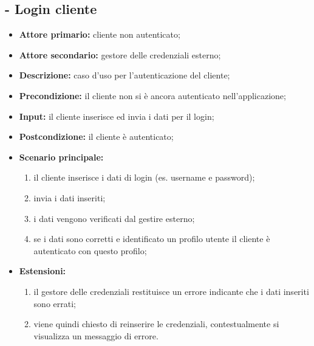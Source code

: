 \subsection{ - Login cliente}
\begin{itemize}
    \item \textbf{Attore primario:} cliente non autenticato;
    \item \textbf{Attore secondario:} gestore delle credenziali esterno;
    \item \textbf{Descrizione:} caso d'uso per l'autenticazione del cliente;
    \item \textbf{Precondizione:} il cliente non si è ancora autenticato nell'applicazione;
    \item \textbf{Input:} il cliente inserisce ed invia i dati per il login;
    \item \textbf{Postcondizione:} il cliente è autenticato;
    \item \textbf{Scenario principale:}
    \begin{enumerate}
        \item il cliente inserisce i dati di login (es. username e password);
        \item invia i dati inseriti;
        \item i dati vengono verificati dal gestire esterno;
        \item se i dati sono corretti e identificato un profilo utente il cliente è autenticato con questo profilo;
    \end{enumerate}
    \item \textbf{Estensioni:}
    \begin{enumerate}
        \item il gestore delle credenziali restituisce un errore indicante che i dati inseriti sono errati;
        \item viene quindi chiesto di reinserire le credenziali, contestualmente si visualizza un messaggio di errore.
    \end{enumerate}
\end{itemize}

\stepUserCase
